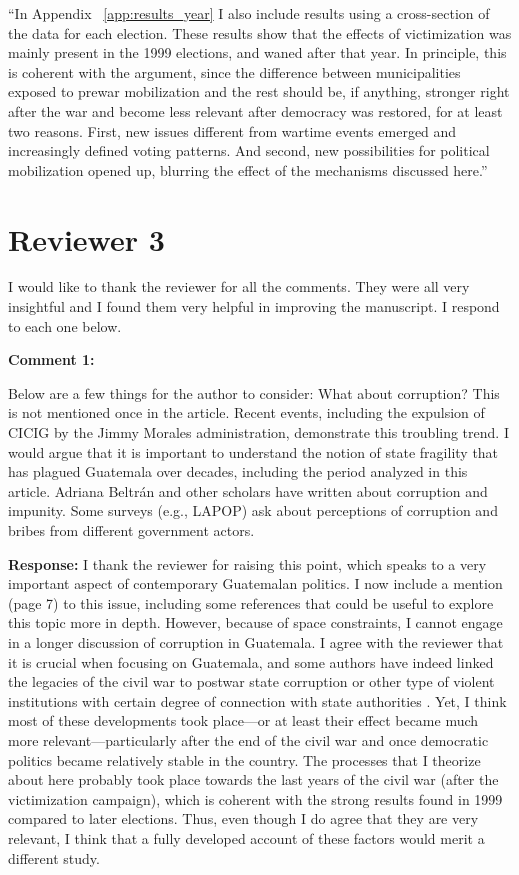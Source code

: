 \documentclass[12pt, a4paper, notitlepage]{article}
\begin{document}
``In Appendix ~\ref{app:results_year} I also include results using a cross-section of the data for each election.
These results show that the effects of victimization was mainly present in the 1999 elections, and waned after that year.
In principle, this is coherent with the argument, since the difference between municipalities exposed to prewar mobilization and the rest should be, if anything, stronger right after the war and become less relevant after democracy was restored, for at least two reasons.
First, new issues different from wartime events emerged and increasingly defined voting patterns.
And second, new possibilities for political mobilization opened up, blurring the effect of the mechanisms discussed here.''

\newpage
\section*{Reviewer 3}

I would like to thank the reviewer for all the comments. They were all very insightful and I found them very helpful in improving the manuscript. I respond to each one below.

\vspace{15pt}
\noindent\textbf{Comment 1:}
\begin{displayquote}
Below are a few things for the author to consider:
What about corruption? This is not mentioned once in the article. Recent events, including the expulsion of CICIG by the Jimmy Morales administration, demonstrate this troubling trend. I would argue that it is important to understand the notion of state fragility that has plagued Guatemala over decades, including the period analyzed in this article. Adriana Beltrán and other scholars have written about corruption and impunity. Some surveys (e.g., LAPOP) ask about perceptions of corruption and bribes from different government actors.
\end{displayquote}

\noindent\textbf{Response:} I thank the reviewer for raising this point, which speaks to a very important aspect of contemporary Guatemalan politics. I now include a mention (page 7) to this issue, including some references that could be useful to explore this topic more in depth. However, because of space constraints, I cannot engage in a longer discussion of corruption in Guatemala. I agree with the reviewer that it is crucial when focusing on Guatemala, and some authors have indeed linked the legacies of the civil war to postwar state corruption \citep{Peacock:2003tt} or other type of violent institutions with certain degree of connection with state authorities \citep{Bateson:2013aa}. Yet, I think most of these developments took place---or at least their effect became much more relevant---particularly after the end of the civil war and once democratic politics became relatively stable in the country.
The processes that I theorize about here probably took place towards the last years of the civil war (after the victimization campaign), which is coherent with the strong results found in 1999 compared to later elections.
Thus, even though I do agree that they are very relevant, I think that a fully developed account of these factors would merit a different study.
\end{document}
